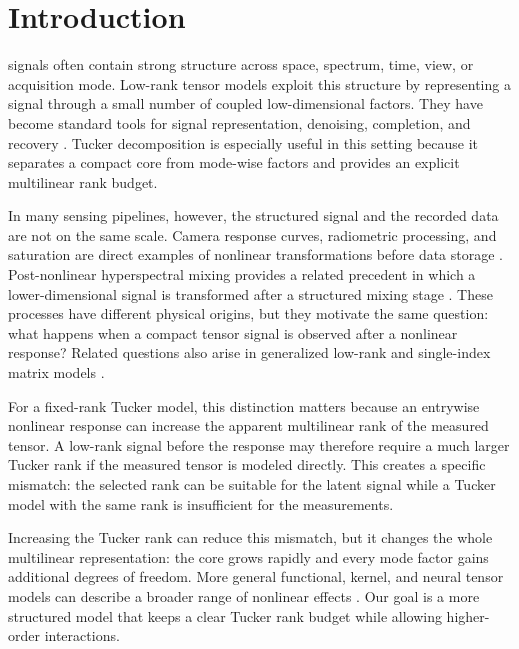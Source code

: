 \section{Introduction}
\label{sec:introduction}

 signals often contain strong structure across
space, spectrum, time, view, or acquisition mode. Low-rank tensor models
exploit this structure by representing a signal through a small number of
coupled low-dimensional factors. They have become standard tools for signal
representation, denoising, completion, and recovery
\cite{Kolda2009Tensor,Sidiropoulos2017TSP,Liu2013TensorCompletion,
LiuMoitra2020TensorCompletion}. Tucker decomposition is especially useful in
this setting because it separates a compact core from mode-wise factors and
provides an explicit multilinear rank budget.

In many sensing pipelines, however, the structured signal and the recorded
data are not on the same scale. Camera response curves, radiometric processing,
and saturation are direct examples of nonlinear transformations before data
storage \cite{Debevec1997HDR,Grossberg2004CameraResponse}. Post-nonlinear
hyperspectral mixing provides a related precedent in which a lower-dimensional
signal is transformed after a structured mixing stage
\cite{BioucasDias2012HyperspectralUnmixing,Altmann2012PostNonlinear,
Heylen2014NonlinearUnmixing}. These processes have different physical origins,
but they motivate the same question: what happens when a compact tensor signal
is observed after a nonlinear response? Related questions also arise in
generalized low-rank and single-index matrix models
\cite{Udell2016GLRM,Ganti2015SingleIndex}.

For a fixed-rank Tucker model, this distinction matters because an entrywise
nonlinear response can increase the apparent multilinear rank of the measured
tensor. A low-rank signal before the response may therefore require a much
larger Tucker rank if the measured tensor is modeled directly. This creates a
specific mismatch: the selected rank can be suitable for the latent signal
while a Tucker model with the same rank is insufficient for the measurements.

Increasing the Tucker rank can reduce this mismatch, but it changes the whole
multilinear representation: the core grows rapidly and every mode factor gains
additional degrees of freedom. More general functional, kernel, and neural
tensor models can describe a broader range of nonlinear effects
\cite{Luo2024LRTFR,saragadam2024deeptensor,ahn2024neural}. Our goal is a more
structured model that keeps a clear Tucker rank budget while allowing
higher-order interactions.

